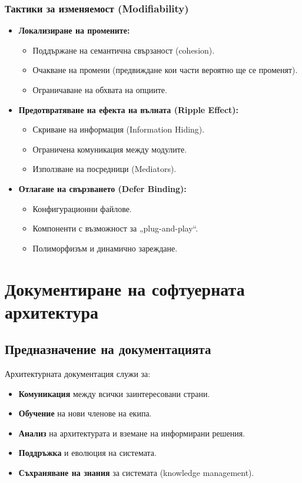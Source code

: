 \documentclass{scrartcl}
\begin{document}
\begin{FlushLeft}
\subsubsection{Тактики за изменяемост (Modifiability)}
\begin{itemize}
    \item \textbf{Локализиране на промените:}
    \begin{itemize}
        \item Поддържане на семантична свързаност (cohesion).
        \item Очакване на промени (предвиждане кои части вероятно ще се променят).
        \item Ограничаване на обхвата на опциите.
    \end{itemize}
    \item \textbf{Предотвратяване на ефекта на вълната (Ripple Effect):}
    \begin{itemize}
        \item Скриване на информация (Information Hiding).
        \item Ограничена комуникация между модулите.
        \item Използване на посредници (Mediators).
    \end{itemize}
    \item \textbf{Отлагане на свързването (Defer Binding):}
    \begin{itemize}
        \item Конфигурационни файлове.
        \item Компоненти с възможност за „plug-and-play“.
        \item Полиморфизъм и динамично зареждане.
    \end{itemize}
\end{itemize}

\newpage
\section{Документиране на софтуерната архитектура}

\subsection{Предназначение на документацията}

Архитектурната документация служи за:
\begin{itemize}
    \item \textbf{Комуникация} между всички заинтересовани страни.
    \item \textbf{Обучение} на нови членове на екипа.
    \item \textbf{Анализ} на архитектурата и вземане на информирани решения.
    \item \textbf{Поддръжка} и еволюция на системата.
    \item \textbf{Съхраняване на знания} за системата (knowledge management).
\end{itemize}


\end{FlushLeft}
\end{document}
